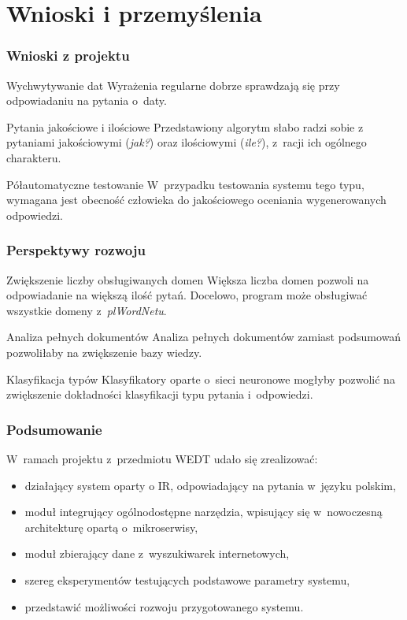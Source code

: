 \documentclass{beamer}
\begin{document}
\section{Wnioski i przemyślenia}
\begin{frame}
  \frametitle{Wnioski z projektu}
  \begin{block}{Wychwytywanie dat}
    Wyrażenia regularne dobrze sprawdzają się przy odpowiadaniu na pytania o~daty.
  \end{block}

  \begin{block}{Pytania jakościowe i ilościowe}
    Przedstawiony algorytm słabo radzi sobie z pytaniami jakościowymi (\textit{jak?}) oraz ilościowymi (\textit{ile?}), z~racji ich ogólnego charakteru.
  \end{block}

  \begin{block}{Półautomatyczne testowanie}
    W~przypadku testowania systemu tego typu, wymagana jest obecność człowieka do jakościowego oceniania wygenerowanych odpowiedzi.
  \end{block}
\end{frame}

\begin{frame}
  \frametitle{Perspektywy rozwoju}
  \begin{block}{Zwiększenie liczby obsługiwanych domen}
    Większa liczba domen pozwoli na odpowiadanie na większą ilość pytań. Docelowo, program może obsługiwać wszystkie domeny z~\textit{plWordNetu}.
  \end{block}

  \begin{block}{Analiza pełnych dokumentów}
    Analiza pełnych dokumentów zamiast podsumowań pozwoliłaby na zwiększenie bazy wiedzy.
  \end{block}

  \begin{block}{Klasyfikacja typów}
    Klasyfikatory oparte o~sieci neuronowe mogłyby pozwolić na zwiększenie dokładności klasyfikacji typu pytania i~odpowiedzi.
  \end{block}

\end{frame}

\begin{frame}
  \frametitle{Podsumowanie}
  W~ramach projektu z~przedmiotu WEDT udało się zrealizować:
  \begin{itemize}
    \item działający system oparty o IR, odpowiadający na pytania w~języku polskim,
    \item moduł integrujący ogólnodostępne narzędzia, wpisujący się w~nowoczesną architekturę opartą o~mikroserwisy,
    \item moduł zbierający dane z~wyszukiwarek internetowych,
    \item szereg eksperymentów testujących podstawowe parametry systemu,
    \item przedstawić możliwości rozwoju przygotowanego systemu.
  \end{itemize}

\end{frame}
\end{document}
